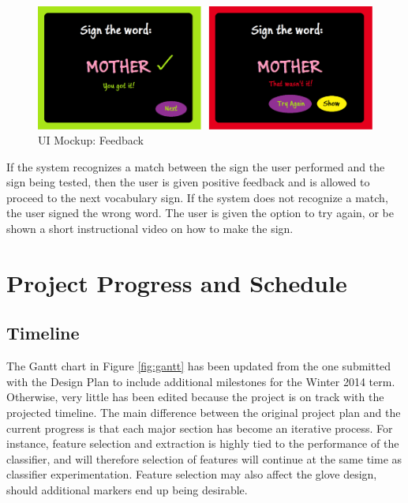 \documentclass[12pt]{article}
\begin{document}
\begin{figure}[h]
  \centering
  \includegraphics[scale=1]{Mother2.png}
  \caption{UI Mockup: Feedback}
  \label{fig:ui2}
\end{figure}

If the system recognizes a match between the sign the user performed and the sign being tested, then the user is given positive feedback and is allowed to proceed to the next vocabulary sign. If the system does not recognize a match, the user signed the wrong word. The user is given the option to try again, or be shown a short instructional video on how to make the sign. 

\newpage
\section{Project Progress and Schedule}
\subsection{Timeline}
The Gantt chart in Figure \ref{fig:gantt} has been updated from the one submitted with the Design Plan to include additional milestones for the Winter 2014 term. Otherwise, very little has been edited because the project is on track with the projected timeline. The main difference between the original project plan and the current progress is that each major section has become an iterative process. For instance, feature selection and extraction is highly tied to the performance of the classifier, and will therefore selection of features will continue at the same time as classifier experimentation. Feature selection may also affect the glove design, should additional markers end up being desirable. 
\end{document}
